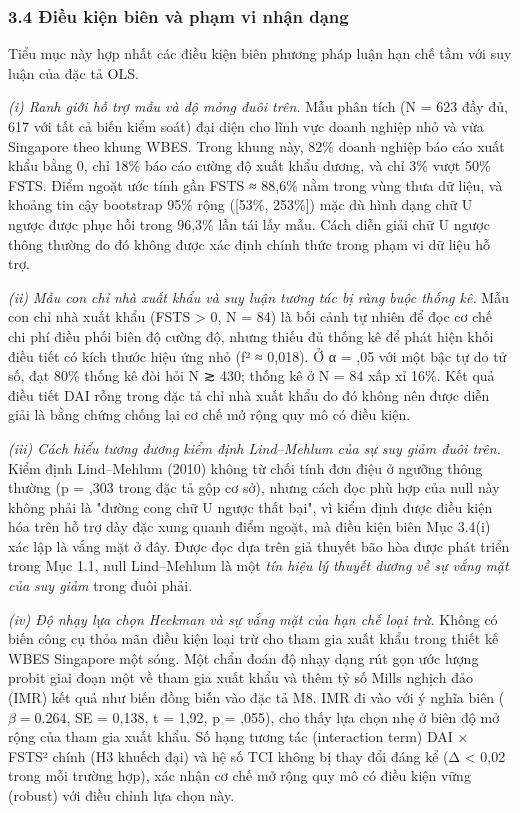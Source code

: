 \documentclass[12pt,a4paper]{article}
\begin{document}
\hypertarget{34-ux111iux1ec1u-kiux1ec7n-biuxean-vuxe0-phux1ea1m-vi-nhux1eadn-dux1ea1ng}{%
\subsubsection{3.4 Điều kiện biên và phạm vi nhận
dạng}\label{34-ux111iux1ec1u-kiux1ec7n-biuxean-vuxe0-phux1ea1m-vi-nhux1eadn-dux1ea1ng}}

Tiểu mục này hợp nhất các điều kiện biên phương pháp luận hạn chế tầm
với suy luận của đặc tả OLS.

\emph{(i) Ranh giới hỗ trợ mẫu và độ mỏng đuôi trên.} Mẫu phân tích (N =
623 đầy đủ, 617 với tất cả biến kiểm soát) đại diện cho lĩnh vực doanh
nghiệp nhỏ và vừa Singapore theo khung WBES. Trong khung này, 82\% doanh
nghiệp báo cáo xuất khẩu bằng 0, chỉ 18\% báo cáo cường độ xuất khẩu
dương, và chỉ 3\% vượt 50\% FSTS. Điểm ngoặt ước tính gần FSTS ≈ 88,6\%
nằm trong vùng thưa dữ liệu, và khoảng tin cậy bootstrap 95\% rộng
({[}53\%, 253\%{]}) mặc dù hình dạng chữ U ngược được phục hồi trong
96,3\% lần tái lấy mẫu. Cách diễn giải chữ U ngược thông thường do đó
không được xác định chính thức trong phạm vi dữ liệu hỗ trợ.

\emph{(ii) Mẫu con chỉ nhà xuất khẩu và suy luận tương tác bị ràng buộc
thống kê.} Mẫu con chỉ nhà xuất khẩu (FSTS \textgreater{} 0, N = 84) là
bối cảnh tự nhiên để đọc cơ chế chi phí điều phối biên độ cường độ,
nhưng thiếu đủ thống kê để phát hiện khối điều tiết có kích thước hiệu
ứng nhỏ (f² ≈ 0,018). Ở α = ,05 với một bậc tự do tử số, đạt 80\% thống
kê đòi hỏi N ≳ 430; thống kê ở N = 84 xấp xỉ 16\%. Kết quả điều tiết DAI
rỗng trong đặc tả chỉ nhà xuất khẩu do đó không nên được diễn giải là
bằng chứng chống lại cơ chế mở rộng quy mô có điều kiện.

\emph{(iii) Cách hiểu tương đương kiểm định Lind--Mehlum của sự suy giảm
đuôi trên.} Kiểm định Lind--Mehlum (2010) không từ chối tính đơn điệu ở
ngưỡng thông thường (p = ,303 trong đặc tả gộp cơ sở), nhưng cách đọc
phù hợp của null này không phải là "đường cong chữ U ngược thất bại", vì
kiểm định được điều kiện hóa trên hỗ trợ dày đặc xung quanh điểm ngoặt,
mà điều kiện biên Mục 3.4(i) xác lập là vắng mặt ở đây. Được đọc dựa
trên giả thuyết bão hòa được phát triển trong Mục 1.1, null Lind--Mehlum
là một \emph{tín hiệu lý thuyết dương về sự vắng mặt của suy giảm} trong
đuôi phải.

\emph{(iv) Độ nhạy lựa chọn Heckman và sự vắng mặt của hạn chế loại
trừ.} Không có biến công cụ thỏa mãn điều kiện loại trừ cho tham gia
xuất khẩu trong thiết kế WBES Singapore một sóng. Một chẩn đoán độ nhạy
dạng rút gọn ước lượng probit giai đoạn một về tham gia xuất khẩu và
thêm tỷ số Mills nghịch đảo (IMR) kết quả như biến đồng biến vào đặc tả
M8. IMR đi vào với ý nghĩa biên (\(\beta = 0.264\), SE = 0,138, t =
1,92, p = ,055), cho thấy lựa chọn nhẹ ở biên độ mở rộng của tham gia
xuất khẩu. Số hạng tương tác (interaction term) DAI × FSTS² chính (H3
khuếch đại) và hệ số TCI không bị thay đổi đáng kể (\textbar Δ\textbar{}
\textless{} 0,02 trong mỗi trường hợp), xác nhận cơ chế mở rộng quy mô
có điều kiện vững (robust) với điều chỉnh lựa chọn này.
\end{document}
